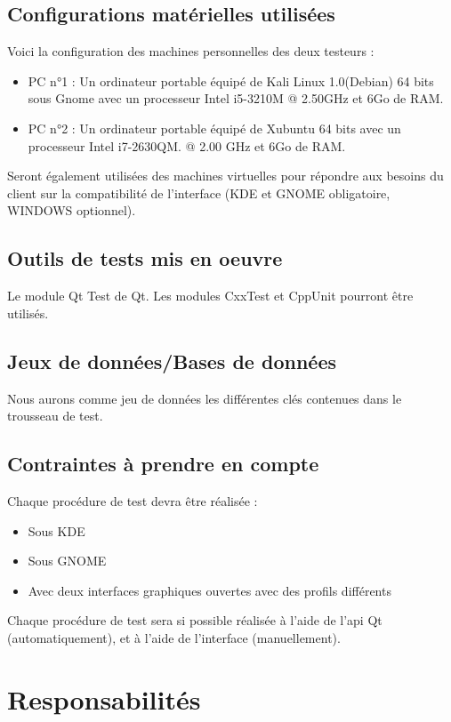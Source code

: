 \documentclass{../res/univ-projet}
\begin{document}
\subsection{Configurations matérielles utilisées}
Voici la configuration des machines personnelles des deux testeurs :
\begin{itemize}
 \item PC n°1 : Un ordinateur portable équipé de Kali Linux 1.0(Debian) 64 bits sous Gnome avec un processeur Intel i5-3210M @ 2.50GHz et 6Go de RAM.
 \item PC n°2 : Un ordinateur portable équipé de Xubuntu 64 bits avec un processeur Intel i7-2630QM.
 @ 2.00 GHz et 6Go de RAM.
\end{itemize}
Seront également utilisées des machines virtuelles pour répondre aux besoins du client sur la compatibilité de l'interface (KDE et GNOME obligatoire,
WINDOWS optionnel).

\subsection{Outils de tests mis en oeuvre}
Le module Qt Test de Qt.
Les modules CxxTest et CppUnit pourront être utilisés.

\subsection{Jeux de données/Bases de données}
Nous aurons comme jeu de données les différentes clés contenues dans le trousseau de test.


\subsection{Contraintes à prendre en compte}
Chaque procédure de test devra être réalisée :
\begin{itemize}
 \item Sous KDE
 \item Sous GNOME
 \item Avec deux interfaces graphiques ouvertes avec des profils différents
\end{itemize}
Chaque procédure de test sera si possible réalisée à l'aide de l'api Qt (automatiquement), et à l'aide de l'interface (manuellement).



\section{Responsabilités}
\end{document}
